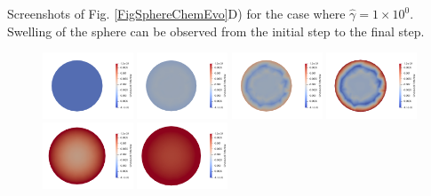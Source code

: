 \documentclass[12pt,3p]{article}
\numberwithin{equation}{section}
\begin{document}
Screenshots of Fig. \ref{FigSphereChemEvo}D) for the case where $\hat{\gamma} = 1 \times 10^{0}$. Swelling of the sphere can be observed from the initial step to the final step. 

\begin{figure}[!htb]
\centering
\includegraphics[width=0.24\textwidth]{./Results/Sphere/S_140_chi_3.0e-01_G_1e+00_l0_2.0e+00/Images/ChemicalPotential/ChemPot_000}
\includegraphics[width=0.24\textwidth]{./Results/Sphere/S_140_chi_3.0e-01_G_1e+00_l0_2.0e+00/Images/ChemicalPotential/ChemPot_059}
\includegraphics[width=0.24\textwidth]{./Results/Sphere/S_140_chi_3.0e-01_G_1e+00_l0_2.0e+00/Images/ChemicalPotential/ChemPot_079}
\includegraphics[width=0.24\textwidth]{./Results/Sphere/S_140_chi_3.0e-01_G_1e+00_l0_2.0e+00/Images/ChemicalPotential/ChemPot_089}
\includegraphics[width=0.24\textwidth]{./Results/Sphere/S_140_chi_3.0e-01_G_1e+00_l0_2.0e+00/Images/ChemicalPotential/ChemPot_099}
\includegraphics[width=0.24\textwidth]{./Results/Sphere/S_140_chi_3.0e-01_G_1e+00_l0_2.0e+00/Images/ChemicalPotential/ChemPot_103}

\end{figure}
\end{document}
